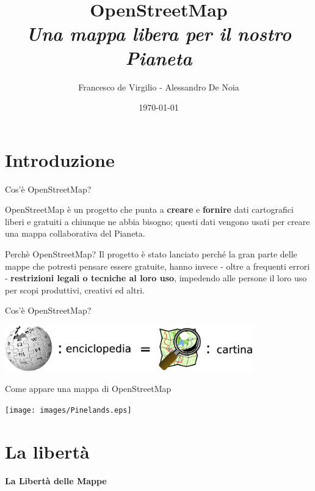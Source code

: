 \documentclass[slidestop,compress,red,notes,xcolor=dvipsnames]{beamer}	%
\title{OpenStreetMap\\\textit{Una mappa libera per il nostro Pianeta}}
\author{Francesco de Virgilio - Alessandro De Noia}
\institute{LUGBari - LinuxDay 2008}
\date{\today}
\begin{document}
\frame{\titlepage}

\section{Introduzione}

    \begin{frame}{Cos'è OpenStreetMap?}
        \begin{center}
            OpenStreetMap è un progetto che punta a \textbf{creare} e \textbf{fornire} dati cartografici liberi e gratuiti a chiunque ne abbia bisogno; questi dati vengono usati per creare una mappa collaborativa del Pianeta.
        \end{center}
        \pause
        \begin{block}{Perchè OpenStreetMap?}
            Il progetto è stato lanciato perché la gran parte delle mappe che potresti pensare essere gratuite, hanno invece - oltre a frequenti errori - \textbf{restrizioni legali o tecniche al loro uso}, impedendo alle persone il loro uso per scopi produttivi, creativi ed altri.
        \end{block}
     \end{frame}

    \begin{frame}{Cos'è OpenStreetMap?}
        \vspace{1cm}
        \begin{center}
            \includegraphics[height=2cm]{images/wiki.eps}
        \end{center}
    \end{frame}

    \begin{frame}{Come appare una mappa di OpenStreetMap}
        \begin{center}
            \texttt{[image: images/Pinelands.eps]}
        \end{center}
    \end{frame}

\section{La libertà}

    \begin{frame}
        \vspace{1.5cm}
        \begin{center}
            \begin{huge}
                \textbf{La Libertà delle Mappe}
            \end{huge}
        \end{center}
    \end{frame}
\end{document}
